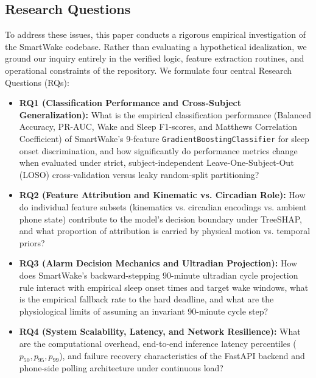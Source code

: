 \documentclass[journal,11pt,onecolumn]{IEEEtran}
\begin{document}
\subsection{Research Questions}
To address these issues, this paper conducts a rigorous empirical investigation of the SmartWake codebase. Rather than evaluating a hypothetical idealization, we ground our inquiry entirely in the verified logic, feature extraction routines, and operational constraints of the repository. We formulate four central Research Questions (RQs):
\begin{itemize}[leftmargin=*]
    \item \textbf{RQ1 (Classification Performance and Cross-Subject Generalization):} What is the empirical classification performance (Balanced Accuracy, PR-AUC, Wake and Sleep F1-scores, and Matthews Correlation Coefficient) of SmartWake's 9-feature \texttt{GradientBoostingClassifier} for sleep onset discrimination, and how significantly do performance metrics change when evaluated under strict, subject-independent Leave-One-Subject-Out (LOSO) cross-validation versus leaky random-split partitioning?
    \item \textbf{RQ2 (Feature Attribution and Kinematic vs. Circadian Role):} How do individual feature subsets (kinematics vs. circadian encodings vs. ambient phone state) contribute to the model's decision boundary under TreeSHAP, and what proportion of attribution is carried by physical motion vs. temporal priors?
    \item \textbf{RQ3 (Alarm Decision Mechanics and Ultradian Projection):} How does SmartWake's backward-stepping 90-minute ultradian cycle projection rule interact with empirical sleep onset times and target wake windows, what is the empirical fallback rate to the hard deadline, and what are the physiological limits of assuming an invariant 90-minute cycle step?
    \item \textbf{RQ4 (System Scalability, Latency, and Network Resilience):} What are the computational overhead, end-to-end inference latency percentiles ($p_{50}, p_{95}, p_{99}$), and failure recovery characteristics of the FastAPI backend and phone-side polling architecture under continuous load?
\end{itemize}
\end{document}
